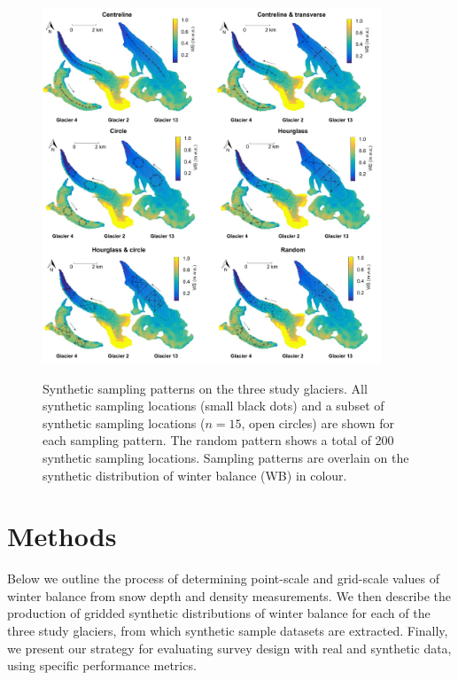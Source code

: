\documentclass{article}
\begin{document}
\begin{figure}
	\centering
	\includegraphics[width =0.9\textwidth]{Pulwicki_Fig2.pdf}\\
	\caption{Synthetic sampling patterns on the three study glaciers. All synthetic sampling locations (small black dots) and a subset of synthetic sampling locations ($n=15$, open circles) are shown for each sampling pattern. The random pattern shows a total of 200 synthetic sampling locations. Sampling patterns are overlain on the synthetic distribution of winter balance (WB) in colour. } 
       \label{fig:SyntheticSampleDesign}
\end{figure}

\section{Methods}

Below we outline the process of determining point-scale and grid-scale values of winter balance from snow depth and density measurements. We then describe the production of gridded synthetic distributions of winter balance for each of the three study glaciers, from which synthetic sample datasets are extracted. Finally, we present our strategy for evaluating survey design with real and synthetic data, using specific performance metrics. 
\end{document}
